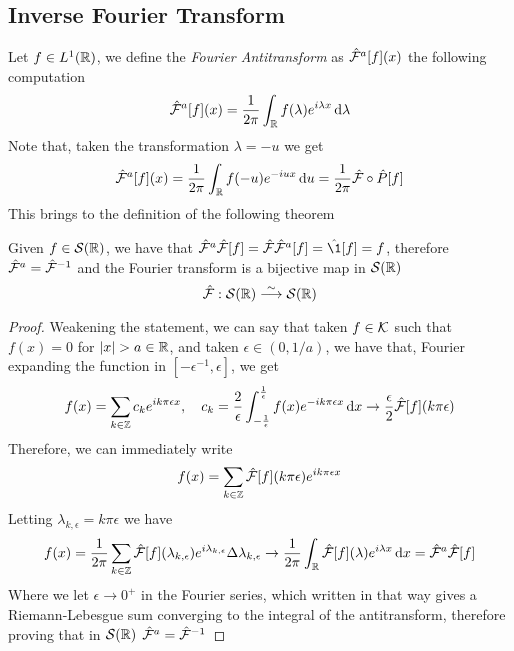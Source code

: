 \documentclass[../complete.tex]{subfiles}
\begin{document}
\subsection{Inverse Fourier Transform}
\begin{dfn}
	Let $f\in L^1(\R)$, we define the \textit{Fourier Antitransform} as $\fou^a[f](x)$ the following computation
	\begin{equation}
		\fou^a[f](x)=\frac{1}{2\pi}\int_{\R}^{}f(\lambda)e^{i\lambda x}\diff\lambda
		\label{eq:fouantitransform}
	\end{equation}
	Note that, taken the transformation $\lambda=-u$ we get
	\begin{equation*}
		\fou^a[f](x)=\frac{1}{2\pi}\int_{\R}^{}f(-u)e^{-iux}\diff u=\frac{1}{2\pi}\fou\circ\opr{P}[f]
		\label{eq:antitrasfopform}
	\end{equation*}
	This brings to the definition of the following theorem
\end{dfn}
\begin{thm}
	Given $f\in\Sp(\R)$, we have that $\fou^a\fou[f]=\fou\fou^a[f]=\opr{\1}[f]=f$, therefore $\fou^a=\fou^{-1}$ and the Fourier transform is a bijective map in $\Sp(\R)$
	\begin{equation*}
		\fou:\Sp(\R)\fto[\sim]\Sp(\R)
	\end{equation*}
\end{thm}
\begin{proof}
	Weakening the statement, we can say that taken $f\in\K$ such that $f(x)=0$ for $\abs{x}>a\in\R$, and taken $\epsilon\in(0,1/a)$, we have that, Fourier expanding the function in $[-\epsilon^{-1},\epsilon]$, we get
	\begin{equation*}
		f(x)=\sum_{k\in\Z}^{}c_ke^{ik\pi\epsilon x},\quad c_k=\frac{2}{\epsilon}\int_{-\frac{1}{\epsilon}}^{\frac{1}{\epsilon}}f(x)e^{-ik\pi\epsilon x}\diff x\to\frac{\epsilon}{2}\fou[f](k\pi\epsilon)
	\end{equation*}
	Therefore, we can immediately write
	\begin{equation*}
		f(x)=\sum_{k\in\Z}\fou[f](k\pi\epsilon)e^{ik\pi\epsilon x}
	\end{equation*}
	Letting $\lambda_{k,\epsilon}=k\pi\epsilon$ we have
	\begin{equation*}
		f(x)=\frac{1}{2\pi}\sum_{k\in\Z}^{}\fou[f](\lambda_{k,\epsilon})e^{i\lambda_{k,\epsilon}}\Delta\lambda_{k,\epsilon}\to\frac{1}{2\pi}\int_{\R}^{}\fou[f](\lambda)e^{i\lambda x}\diff x=\fou^a\fou[f]
	\end{equation*}
	Where we let $\epsilon\to0^+$ in the Fourier series, which written in that way gives a Riemann-Lebesgue sum converging to the integral of the antitransform, therefore proving that in $\Sp(\R)$ $\fou^a=\fou^{-1}$
\end{proof}
\end{document}
